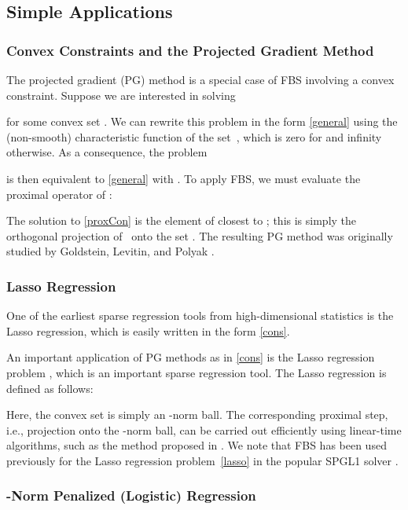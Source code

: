 \documentclass{amsart}
\newcommand{\half}{\frac{1}{2}}
\newcommand{\eqn}[2]{}
\newcommand{\st}{\hbox{ \,\,subject to\,\, }}
\newcommand{\ellone}{}
\newcommand{\Chi}{\mathcal{X}}
\DeclareMathOperator*{\minimize}{minimize\quad}
\DeclareMathOperator*{\argmin}{arg\,min}
\DeclareMathOperator{\prox}{prox}
\theoremstyle{definition}
\begin{document}
\newpage
\subsection{Simple Applications}
\subsubsection{Convex Constraints and the Projected Gradient Method}  \label{sec:projGrad}
The projected gradient (PG) method is a special case of FBS involving a convex constraint.
Suppose we are interested in solving 
 \eqn{cons}{\minimize f(x) \,\, \st x\in \mathcal{C}}
 for some convex set .  We can rewrite this problem in the form \eqref{general} using the (non-smooth) characteristic function  of the set~, which is zero for  and infinity otherwise.  As a consequence, the  problem
   
is then equivalent to \eqref{general} with .  To apply FBS, we must evaluate the proximal operator of :  
 \eqn{proxCon}{
 \prox_{\Chi_\mathcal{C}}(z,\tau) = \argmin_{x\in \mathcal{C}}  \half \|x-z\|^2.
 } 
The solution to \eqref{proxCon} is the element of  closest to ; this is simply the orthogonal projection of~ onto the set . 
The resulting PG method was originally studied by Goldstein, Levitin, and Polyak \cite{Bertsekas76,Goldstein64,LP66}.

\subsubsection{Lasso Regression}
One of the earliest sparse regression tools from high-dimensional statistics is the Lasso regression, which is easily written in the form \eqref{cons}.

An important application of PG methods as in \eqref{cons} is the Lasso regression problem \cite{Tibshirani94}, which is an important sparse regression tool.  The Lasso regression is defined as follows:
\eqn{lasso}{
 \minimize   \half \| Ax-b \|^2
 \st \|x\|_1\le \lambda.
}
Here, the convex set  is simply an \ellone-norm ball.  
The corresponding  proximal step, i.e., projection onto the \ellone{}-norm ball, can be carried out efficiently using linear-time algorithms, such as the method proposed in \cite{DSSC08}. We note that FBS has been used previously for the Lasso regression problem~\eqref{lasso} in the  popular SPGL1 solver \cite{VF07,VF08}.



\subsubsection{{}-Norm Penalized (Logistic) Regression} \label{sec:l1ls}
\end{document}
